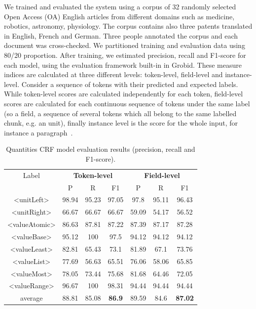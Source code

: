 \documentclass[sigconf]{acmart}
\begin{document}
We trained and evaluated the system using a corpus of 32 randomly selected Open Access (OA) English articles from different domains such as medicine, robotics, astronomy, physiology. The corpus contains also three patents translated in English, French and German. Three people annotated the corpus and each document was cross-checked. We partitioned training and evaluation data using 80/20 proportion. After training, we estimated precision, recall and F1-score for each model, using the evaluation framework built-in in Grobid. These measure indices are calculated at three different levels: token-level, field-level and instance-level. Consider a sequence of tokens with their predicted and expected labels. While token-level scores are calculated independently for each token, field-level scores are calculated for each continuous sequence of tokens under the same label (so a field, a sequence of several tokens which all belong to the same labelled chunk, e.g. an unit), finally instance level is the score for the whole input, for instance a paragraph~\cite{foppiano2019proposal}. 

\begin{table}[ht]
   \caption{Quantities CRF model evaluation results (precision, recall and F1-score).}
   \label{tab:quantities-evaluation}
   \begin{tabular}{c|ccc|ccc}
       \toprule
       Label & \multicolumn{3}{c}{\textbf{Token-level}} & \multicolumn{3}{c}{\textbf{Field-level}}\\
        & P & R & F1 & P & R & F1 \\
       \midrule
       <unitLeft>    & 98.94 & 95.23 & 97.05 & 97.8  & 95.11 & 96.43\\
       <unitRight>   & 66.67 & 66.67 & 66.67 & 59.09 & 54.17 & 56.52\\
       <valueAtomic> & 86.63 & 87.81 & 87.22 & 87.39 & 87.17 & 87.28\\
       <valueBase>   & 95.12 & 100   & 97.5  & 94.12 & 94.12 & 94.12\\
       <valueLeast>  & 82.81 & 65.43 & 73.1  & 81.89 & 67.1  & 73.76\\
       <valueList>   & 77.69 & 56.63 & 65.51 & 76.06 & 58.06 & 65.85\\
       <valueMost>   & 78.05 & 73.44 & 75.68 & 81.68 & 64.46 & 72.05\\
       <valueRange>  & 96.67 & 100   & 98.31 & 94.44 & 94.44 & 94.44\\
       \midrule
       average       & 88.81  & 85.08 & \textbf{86.9} & 89.59 & 84.6 & \textbf{87.02}\\
       \bottomrule
   \end{tabular}
\end{table}
\end{document}
